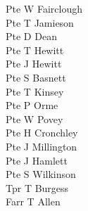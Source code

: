 \begin{multicols}{3}
  Pte W Fairclough \\
  Pte T Jamieson \\
  Pte D Dean \\
  Pte T Hewitt \\
  Pte J Hewitt \\
  Pte S Basnett \\
  Pte T Kinsey \\
  Pte P Orme \\
  Pte W Povey \\
  Pte H Cronchley \\
  Pte J Millington \\
  Pte J Hamlett \\
  Pte S Wilkinson \\
  Tpr T Burgess \\
  Farr T Allen \\
\end{multicols}
